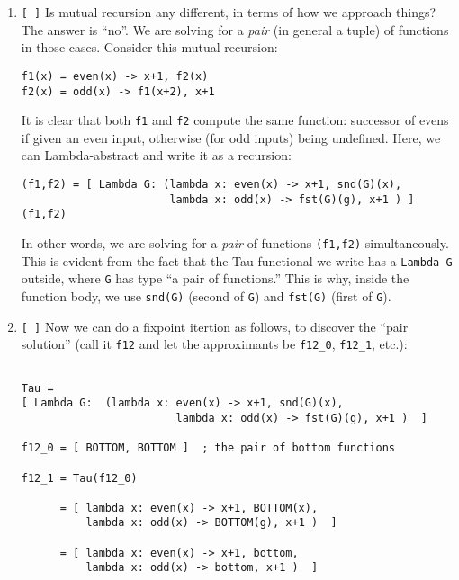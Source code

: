 \documentclass[11pt]{article}
\begin{document}
\begin{Large}
\begin{enumerate}
\item \verb|[ ]|
  Is mutual recursion any different, in terms of how
  we approach things?
  The answer is ``no''.
  We are solving for a {\em pair} (in general a tuple)
  of functions in those cases.
  Consider this mutual recursion:

\begin{verbatim}
f1(x) = even(x) -> x+1, f2(x)
f2(x) = odd(x) -> f1(x+2), x+1
  \end{verbatim}

It is clear that both {\tt f1} and {\tt f2} compute the
same function: successor of evens if given an even input, otherwise
(for odd inputs) being undefined.
%
Here, we can Lambda-abstract and write it as a recursion:

\begin{footnotesize}
\begin{verbatim}
(f1,f2) = [ Lambda G: (lambda x: even(x) -> x+1, snd(G)(x),
                       lambda x: odd(x) -> fst(G)(g), x+1 ) ] (f1,f2)
\end{verbatim}
\end{footnotesize}

In other words, we are solving for a {\em pair} of functions
{\tt (f1,f2)} simultaneously.
%
This is evident from the fact that the Tau functional we write
has a {\tt Lambda G} outside, where {\tt G} has type ``a pair
of functions.''
%
This is why, inside the function body, we use
{\tt snd(G)} (second of {\tt G}) and
{\tt fst(G)} (first of {\tt G}).


\item  \verb|[ ]|
  Now we can do a fixpoint itertion as follows, to discover
  the ``pair solution'' (call it {\tt f12} and
  let the approximants be \verb|f12_0|, \verb|f12_1|, etc.):

  \begin{footnotesize}
\begin{verbatim}

Tau = 
[ Lambda G:  (lambda x: even(x) -> x+1, snd(G)(x),
                        lambda x: odd(x) -> fst(G)(g), x+1 )  ] 

f12_0 = [ BOTTOM, BOTTOM ]  ; the pair of bottom functions

f12_1 = Tau(f12_0)

      = [ lambda x: even(x) -> x+1, BOTTOM(x),
          lambda x: odd(x) -> BOTTOM(g), x+1 )  ]

      = [ lambda x: even(x) -> x+1, bottom,
          lambda x: odd(x) -> bottom, x+1 )  ]


\end{verbatim}
\end{footnotesize}
\end{enumerate}
\end{Large}
\end{document}
